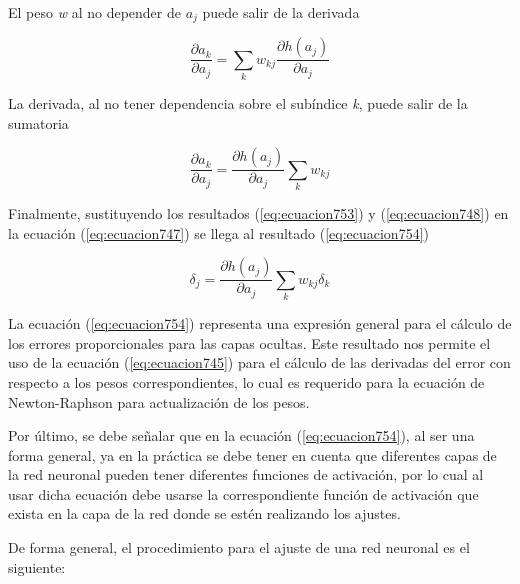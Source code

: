 {El peso \textit{w} al no depender de \textit{$a_j$} puede salir de la derivada

\begin{equation}
	\frac{\partial{a_k}}{\partial{a_{j}}}=\sum_{k}^{} {w_{kj} \frac{\partial{h(a_j)}}{\partial{a_{j}}}}
	\label{eq:ecuacion752}
\end{equation}

La derivada, al no tener dependencia sobre el subíndice \textit{k}, puede salir de la sumatoria 

\begin{equation}
	\frac{\partial{a_k}}{\partial{a_{j}}}=\frac{\partial{h(a_j)}}{\partial{a_{j}}} \sum_{k}^{} {w_{kj}} 
	\label{eq:ecuacion753}
\end{equation}

Finalmente, sustituyendo los resultados (\ref{eq:ecuacion753}) y (\ref{eq:ecuacion748}) en la ecuación (\ref{eq:ecuacion747}) se llega al resultado (\ref{eq:ecuacion754})

\begin{equation}
	\delta_{j}=\frac{\partial{h(a_j)}}{\partial{a_{j}}} \sum_{k}^{} {w_{kj} \delta_{k}} 
	\label{eq:ecuacion754}
\end{equation}


La ecuación (\ref{eq:ecuacion754}) representa una expresión general para el cálculo de los errores proporcionales para las capas ocultas. Este resultado nos permite el uso de la ecuación (\ref{eq:ecuacion745}) para el cálculo 
de las derivadas del error con respecto a los pesos correspondientes, lo cual es requerido para la ecuación de Newton-Raphson para actualización de los pesos. 

Por último, se debe señalar que en la ecuación (\ref{eq:ecuacion754}), al ser una forma general, ya en la práctica se debe tener en cuenta que diferentes capas de la red neuronal pueden tener diferentes funciones de activación, 
por lo cual al usar dicha ecuación debe usarse la correspondiente función de activación que exista en la capa de la red donde se estén realizando los ajustes.

De forma general, el procedimiento para el ajuste de una red neuronal es el siguiente:

}
